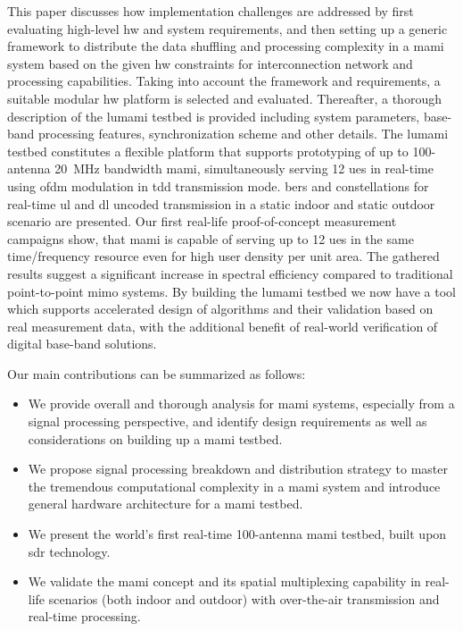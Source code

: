 \documentclass[journal]{IEEEtran}
\begin{document}
This paper discusses how implementation challenges are addressed by first evaluating high-level \gls{hw} and system requirements, and then setting up a generic framework to distribute the data shuffling and processing complexity in a \gls{mami} system based on the given \gls{hw} constraints for interconnection network and processing capabilities. 
Taking into account the framework and requirements, a suitable modular \gls{hw} platform is selected and evaluated.
Thereafter, a thorough description of the \gls{lumami} testbed is provided including system parameters, base-band processing features, synchronization scheme and other details.
The \gls{lumami} testbed constitutes a flexible platform that supports prototyping of up to 100-antenna \SI{20}{\mega\hertz} bandwidth \gls{mami}, simultaneously serving 12 \glspl{ue} in real-time using \gls{ofdm} modulation in \gls{tdd} transmission mode.
%
%
\Glspl{ber} and constellations for real-time \gls{ul} and \gls{dl} uncoded transmission in a static indoor and static outdoor scenario are presented.
Our first real-life proof-of-concept measurement campaigns show, that \gls{mami} is capable of serving up to 12 \glspl{ue} in the same time/frequency resource even for high user density per unit area.
%
The gathered results suggest a significant increase in spectral efficiency compared to traditional point-to-point \gls{mimo} systems.
By building the \gls{lumami} testbed we now have a tool which supports accelerated design of algorithms\cite{DBLP:journals/corr/VieiraREMLT16} and their validation based on real measurement data, with the additional benefit of real-world verification of digital base-band solutions.

Our main contributions can be summarized as follows:
\begin{itemize}
%
%
%
	\item We provide overall and thorough analysis for \gls{mami} systems, especially from a signal processing perspective, and identify design requirements as well as considerations on building up a \gls{mami} testbed.
	\item We propose signal processing breakdown and distribution strategy to master the tremendous computational complexity in a \gls{mami} system and introduce general hardware architecture for a \gls{mami} testbed.
	\item We present the world's first real-time 100-antenna \gls{mami} testbed, built upon \gls{sdr} technology.
	\item We validate the \gls{mami} concept and its spatial multiplexing capability in real-life scenarios (both indoor and outdoor) with over-the-air transmission and real-time processing. 
\end{itemize}
\end{document}
